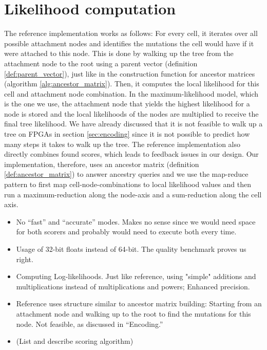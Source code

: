 \section{Likelihood computation}
\label{sec:scoring}

The reference implementation works as follows: For every cell, it iterates over all possible attachment nodes and identifies the mutations the cell would have if it were attached to this node. This is done by walking up the tree from the attachment node to the root using a parent vector (definition \ref{def:parent_vector}), just like in the construction function for ancestor matrices (algorithm \ref{alg:ancestor_matrix}). Then, it computes the local likelihood for this cell and attachment node combination. In the maximum-likelihood model, which is the one we use, the attachment node that yields the highest likelihood for a node is stored and the local likelihoods of the nodes are multiplied to receive the final tree likelihood. We have already discussed that it is not feasible to walk up a tree on \acp{FPGA} in section \ref{sec:encoding} since it is not possible to predict how many steps it takes to walk up the tree. The reference implementation also directly combines found scores, which leads to feedback issues in our design. Our implementation, therefore, uses an ancestor matrix (definition \ref{def:ancestor_matrix}) to answer ancestry queries and we use the map-reduce pattern to first map cell-node-combinations to local likelihood values and then run a maximum-reduction along the node-axis and a sum-reduction along the cell axis.


\begin{itemize}
    \item No ``fast'' and ``accurate'' modes. Makes no sense since we would need space for both scorers and probably would need to execute both every time.
    \item Usage of 32-bit floats instead of 64-bit. The quality benchmark proves us right.
    \item Computing Log-likelihoods. Just like reference, using "simple" additions and multiplications instead of multiplications and powers; Enhanced precision.
    \item Reference uses structure similar to ancestor matrix building: Starting from an attachment node and walking up to the root to find the mutations for this node. Not feasible, as discussed in ``Encoding.''
    \item (List and describe scoring algorithm)
\end{itemize}

